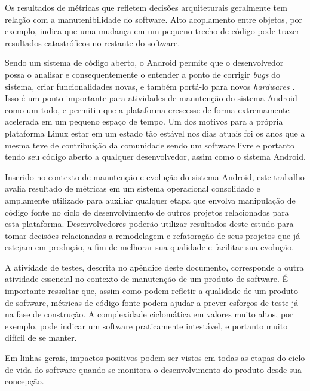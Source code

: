 Os resultados de métricas que refletem decisões arquiteturais geralmente tem relação com a manutenibilidade do software. Alto acoplamento entre objetos, por exemplo, indica que uma mudança em um pequeno trecho de código pode trazer resultados catastróficos no restante do software.

Sendo um sistema de código aberto, o Android permite que o desenvolvedor possa o analisar e consequentemente o entender a ponto de corrigir \textit{bugs} do sistema, criar funcionalidades novas, e também portá-lo para novos \textit{hardwares} \cite{googleandroid}. Isso é um ponto importante para atividades de manutenção do sistema Android como um todo, e permitiu que a plataforma crescesse de forma extremamente acelerada em um pequeno espaço de tempo. Um dos motivos para a própria plataforma Linux estar em um estado tão estável nos dias atuais foi os anos que a mesma teve de contribuição da comunidade sendo um software livre e portanto tendo seu código aberto a qualquer desenvolvedor, assim como o sistema Android.

Inserido no contexto de manutenção e evolução do sistema Android, este trabalho avalia resultado de métricas em um sistema operacional consolidado e amplamente utilizado para auxiliar qualquer etapa que envolva manipulação de código fonte no ciclo de desenvolvimento de outros projetos relacionados para esta plataforma. Desenvolvedores poderão utilizar resultados deste estudo para tomar decisões relacionadas a remodelagem e refatoração de seus projetos que já estejam em produção, a fim de melhorar sua qualidade e facilitar sua evolução.

A atividade de testes, descrita no apêndice deste documento, corresponde a outra atividade essencial no contexto de manutenção de um produto de software. É importante ressaltar que, assim como podem refletir a qualidade de um produto de software, métricas de código fonte podem ajudar a prever esforços de teste já na fase de construção. A complexidade ciclomática em valores muito altos, por exemplo, pode indicar um software praticamente intestável, e portanto muito difícil de se manter.

Em linhas gerais, impactos positivos podem ser vistos em todas as etapas do ciclo de vida do software quando se monitora o desenvolvimento do produto desde sua concepção.